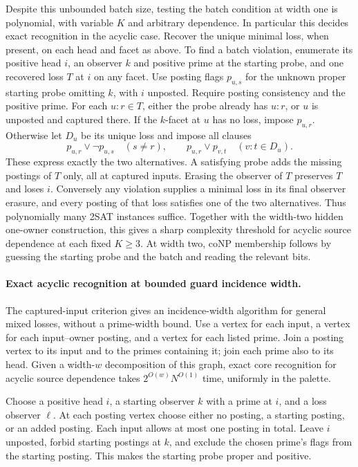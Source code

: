 Despite this unbounded batch size, testing the batch
condition at width one is polynomial, with variable
$K$ and arbitrary dependence. In particular this
decides exact recognition in the acyclic case.
Recover the unique minimal loss,
when present, on each head and facet as above.
To find a batch violation, enumerate its positive
head $i$, an observer $k$ and positive prime at the
starting probe, and one recovered loss $T$ at $i$
on any facet. Use posting flags $p_{u,s}$ for the
unknown proper starting probe omitting $k$, with
$i$ unposted. Require posting consistency and the
positive prime. For each $u:r\in T$, either the probe
already has $u:r$, or $u$ is unposted and captured
there. If the $k$-facet at $u$ has no loss, impose
$p_{u,r}$. Otherwise let $D_u$ be its unique loss
and impose all clauses
\[
  p_{u,r}\vee\neg p_{u,s}\quad(s\ne r),\qquad
  p_{u,r}\vee p_{v,t}\quad(v:t\in D_u).
\]
These express exactly the two alternatives. A
satisfying probe adds the missing postings of
$T$ only, all at captured inputs. Erasing the
observer of $T$ preserves $T$ and loses $i$.
Conversely any violation supplies a minimal loss
in its final observer erasure, and every posting
of that loss satisfies one of the two alternatives.
Thus polynomially many 2SAT instances suffice.
Together with the width-two hidden one-owner
construction, this gives a sharp complexity threshold
for acyclic source dependence at each fixed $K\ge3$.
At width two, coNP membership follows by guessing the
starting probe and the batch and reading the relevant
bits.

\paragraph{Exact acyclic recognition at bounded guard incidence width.}
The captured-input criterion gives an
incidence-width algorithm for general
mixed losses, without a prime-width
bound. Use a vertex for each input, a
vertex for each input--owner posting,
and a vertex for each listed prime.
Join a posting vertex to its input
and to the primes containing it;
join each prime also to its head.
Given a width-$w$ decomposition of
this graph, exact core recognition
for acyclic source dependence takes
$2^{O(w)}N^{O(1)}$ time, uniformly
in the palette.

Choose a positive head $i$, a starting
observer $k$ with a prime at $i$, and a
loss observer $\ell$. At each posting
vertex choose either no posting, a
starting posting, or an added posting.
Each input allows at most one posting
in total. Leave $i$ unposted, forbid
starting postings at $k$, and exclude
the chosen prime's flags from the
starting posting. This makes the
starting probe proper and positive.

